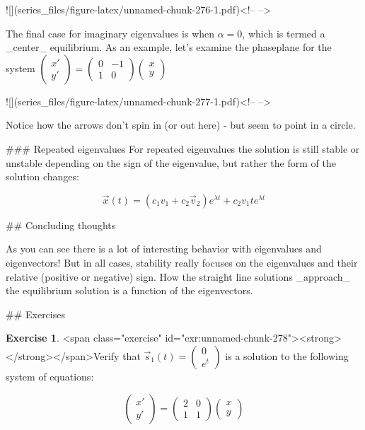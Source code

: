 \documentclass[
]{book}
\theoremstyle{definition}
\theoremstyle{definition}
\theoremstyle{definition}
\newtheorem{exercise}{Exercise}[chapter]
\theoremstyle{remark}
\begin{document}
![](series_files/figure-latex/unnamed-chunk-276-1.pdf)<!-- --> 

The final case for imaginary eigenvalues is when $\alpha = 0$, which is termed a _center_ equilibrium.  As an example, let's examine the phaseplane for the system $\displaystyle 
\begin{pmatrix} x' \\ y' \end{pmatrix} =\begin{pmatrix} 0 & -1 \\ 1 &  0 \end{pmatrix} \begin{pmatrix} x \\ y \end{pmatrix}$

![](series_files/figure-latex/unnamed-chunk-277-1.pdf)<!-- --> 

Notice how the arrows don't spin in (or out here) - but seem to point in a circle.


### Repeated eigenvalues
For repeated eigenvalues the solution is still stable or unstable depending on the sign of the eigenvalue, but rather the form of the solution changes:

\begin{equation}
\vec{x}(t) = \left( c_{1} v_{1} + c_{2} \vec{v}_{2} \right) e^{\lambda t} + c_{2} v_{1} t e^{\lambda t}
\end{equation}



## Concluding thoughts

As you can see there is a lot of interesting behavior with eigenvalues and eigenvectors!  But in all cases, stability really focuses on the eigenvalues and their relative (positive or negative) sign.  How the straight line solutions _approach_ the equilibrium solution is a function of the eigenvectors.








\newpage

## Exercises
\begin{exercise}
<span class="exercise" id="exr:unnamed-chunk-278"><strong>\label{exr:unnamed-chunk-278} </strong></span>Verify that $\displaystyle  \vec{s}_{1}(t) = \begin{pmatrix} 0 \\ e^{t} \end{pmatrix}$ is a solution to the following system of equations:

\begin{equation}
\begin{pmatrix} x' \\ y' \end{pmatrix} =\begin{pmatrix} 2 & 0 \\ 1 &  1 \end{pmatrix} \begin{pmatrix} x \\ y \end{pmatrix}
\end{equation}
\end{exercise}
\end{document}
